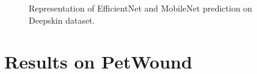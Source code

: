 \documentclass[../main.tex]{subfiles}
\begin{document}
\begin{figure}[H]



\caption{Representation of EfficientNet and MobileNet prediction on  Deepskin dataset.}
\label{fig:deep-visual-results}
\end{figure}



\section{Results on PetWound}
\end{document}
